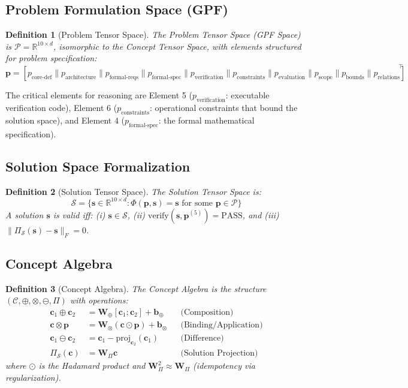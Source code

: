 \documentclass{article}
\newtheorem{definition}{Definition}
\newcommand{\R}{\mathbb{R}}
\newcommand{\cC}{\mathcal{C}}
\newcommand{\cP}{\mathcal{P}}
\newcommand{\cS}{\mathcal{S}}
\newcommand{\bW}{\mathbf{W}}
\newcommand{\bc}{\mathbf{c}}
\newcommand{\bp}{\mathbf{p}}
\newcommand{\bs}{\mathbf{s}}
\begin{document}
\subsection{Problem Formulation Space (GPF)}

\begin{definition}[Problem Tensor Space]
The Problem Tensor Space (GPF Space) is $\cP = \R^{10 \times d}$, isomorphic to the Concept Tensor Space, with elements structured for problem specification:
\begin{equation}
\bp = [p_{\text{core-def}} \| p_{\text{architecture}} \| p_{\text{formal-reqs}} \| p_{\text{formal-spec}} \| p_{\text{verification}} \| p_{\text{constraints}} \| p_{\text{evaluation}} \| p_{\text{scope}} \| p_{\text{bounds}} \| p_{\text{relations}}]^\top
\end{equation}
\end{definition}

The critical elements for reasoning are Element 5 ($p_{\text{verification}}$: executable verification code), Element 6 ($p_{\text{constraints}}$: operational constraints that bound the solution space), and Element 4 ($p_{\text{formal-spec}}$: the formal mathematical specification).

\subsection{Solution Space Formalization}

\begin{definition}[Solution Tensor Space]
The Solution Tensor Space is:
\begin{equation}
\cS = \{\bs \in \R^{10 \times d} : \Phi(\bp, \bs) = \bs \text{ for some } \bp \in \cP\}
\end{equation}
A solution $\bs$ is \emph{valid} iff: (i) $\bs \in \cS$, (ii) $\mathrm{verify}(\bs, \bp^{(5)}) = \mathrm{PASS}$, and (iii) $\|\Pi_\cS(\bs) - \bs\|_F = 0$.
\end{definition}

\subsection{Concept Algebra}

\begin{definition}[Concept Algebra]
The Concept Algebra is the structure $(\cC, \oplus, \otimes, \ominus, \Pi)$ with operations:
\begin{align}
\bc_1 \oplus \bc_2 &= \bW_\oplus [\bc_1; \bc_2] + \mathbf{b}_\oplus && \text{(Composition)} \\
\bc \otimes \bp &= \bW_\otimes (\bc \odot \bp) + \mathbf{b}_\otimes && \text{(Binding/Application)} \\
\bc_1 \ominus \bc_2 &= \bc_1 - \mathrm{proj}_{\bc_2}(\bc_1) && \text{(Difference)} \\
\Pi_\cS(\bc) &= \bW_\Pi \bc && \text{(Solution Projection)}
\end{align}
where $\odot$ is the Hadamard product and $\bW_\Pi^2 \approx \bW_\Pi$ (idempotency via regularization).
\end{definition}
\end{document}
